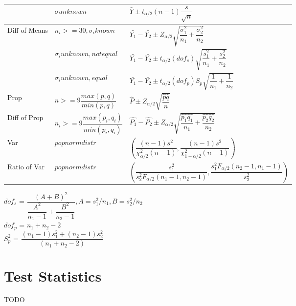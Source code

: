 \documentclass{article}
\begin{document}
\begin{multicols}{2}
\begin{tabular}{| l | l | l |}
& $\sigma unknown$ & $\bar{Y} \pm t_{\alpha/2}(n-1)\dfrac{s}{\sqrt{n}}$ \\ \hline

Diff of Means & $n_i>=30, \sigma_i known$ & $\bar{Y_1} - \bar{Y_2} \pm Z_{\alpha/2}\sqrt{\dfrac{\sigma_1^2}{n_1}+\dfrac{\sigma_2^2}{n_2}}$ \\ \hline

& $\sigma_i unknown, not equal$ & $\bar{Y_1} - \bar{Y_2} \pm t_{\alpha/2}(dof_s)\sqrt{\dfrac{s_1^2}{n_1}+\dfrac{s_2^2}{n_2}}$\\ \hline

& $\sigma_i unknown, equal$ & $\bar{Y_1} - \bar{Y_2} \pm t_{\alpha/2}(dof_p)S_p\sqrt{\dfrac{1}{n_1}+\dfrac{1}{n_2}}$\\ \hline

Prop & $n>=9\dfrac{max(p,q)}{min(p,q)}$ & $\hat{P} \pm Z_{\alpha/2}\sqrt{\dfrac{\hat{p}\hat{q}}{n}}$ \\ \hline

Diff of Prop & $n_i>=9\dfrac{max(p_i,q_i)}{min(p_i,q_i)}$ & $\hat{P_1} - \hat{P_2} \pm Z_{\alpha/2}\sqrt{\dfrac{\hat{p_1}\hat{q_1}}{n_1}+\dfrac{\hat{p_2}\hat{q_2}}{n_2}}$ \\ \hline

Var & $pop norm distr$ & $(\dfrac{(n-1)s^2}{\chi_{\alpha/2}^2(n-1)}, \dfrac{(n-1)s^2}{\chi_{1-\alpha/2}^2(n-1)})$ \\ \hline

Ratio of Var & $pop norm distr$ & $(\dfrac{s_1^2}{s_2^2F_{\alpha/2}(n_1-1, n_2-1)}, \dfrac{s_1^2F_{\alpha/2}(n_2-1, n_1-1)}{s_2^2})$ \\ \hline
\end{tabular}
\textbf{$dof_s$} = $\dfrac{(A + B)^2}{\dfrac{A^2}{n_1-1} + \dfrac{B^2}{n_2-1}}, A = s_1^2/n_1, B = s_2^2/n_2$ \\
\textbf{$dof_p$} = $n_1 + n_2 - 2$ \\
\textbf{$S_p^2$} = $\dfrac{(n_1-1)s_1^2+(n_2-1)s_2^2}{(n_1+n_2-2)}$\\

\section{Test Statistics}
TODO
\end{multicols}
\end{document}
